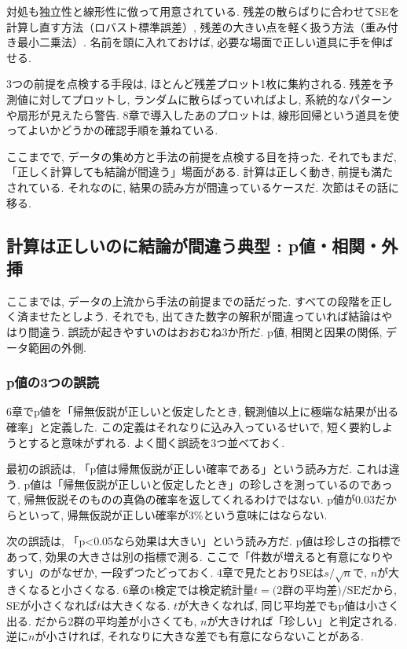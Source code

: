 対処も独立性と線形性に倣って用意されている.
残差の散らばりに合わせてSEを計算し直す方法（ロバスト標準誤差）, 残差の大きい点を軽く扱う方法（重み付き最小二乗法）.
名前を頭に入れておけば, 必要な場面で正しい道具に手を伸ばせる.

3つの前提を点検する手段は, ほとんど残差プロット1枚に集約される.
残差を予測値に対してプロットし, ランダムに散らばっていればよし, 系統的なパターンや扇形が見えたら警告.
8章で導入したあのプロットは, 線形回帰という道具を使ってよいかどうかの確認手順を兼ねている.

ここまでで, データの集め方と手法の前提を点検する目を持った.
それでもまだ, 「正しく計算しても結論が間違う」場面がある.
計算は正しく動き, 前提も満たされている. それなのに, 結果の読み方が間違っているケースだ.
次節はその話に移る.


\subsection{計算は正しいのに結論が間違う典型 : p値・相関・外挿}

ここまでは, データの上流から手法の前提までの話だった.
すべての段階を正しく済ませたとしよう.
それでも, 出てきた数字の解釈が間違っていれば結論はやはり間違う.
誤読が起きやすいのはおおむね3か所だ. p値, 相関と因果の関係, データ範囲の外側.

\subsubsection*{p値の3つの誤読}

6章でp値を「帰無仮説が正しいと仮定したとき, 観測値以上に極端な結果が出る確率」と定義した.
この定義はそれなりに込み入っているせいで, 短く要約しようとすると意味がずれる.
よく聞く誤読を3つ並べておく.

最初の誤読は, 「p値は帰無仮説が正しい確率である」という読み方だ.
これは違う. p値は「帰無仮説が正しいと仮定したとき」の珍しさを測っているのであって, 帰無仮説そのものの真偽の確率を返してくれるわけではない.
p値が0.03だからといって, 帰無仮説が正しい確率が3\%という意味にはならない.

次の誤読は, 「p<0.05なら効果は大きい」という読み方だ.
p値は珍しさの指標であって, 効果の大きさは別の指標で測る.
ここで「件数が増えると有意になりやすい」のがなぜか, 一段ずつたどっておく.
4章で見たとおりSEは$s/\sqrt{n}$で, $n$が大きくなると小さくなる.
6章のt検定では検定統計量$t = \text{(2群の平均差)}/\text{SE}$だから, SEが小さくなれば$t$は大きくなる.
$t$が大きくなれば, 同じ平均差でもp値は小さく出る.
だから2群の平均差が小さくても, $n$が大きければ「珍しい」と判定される.
逆に$n$が小さければ, それなりに大きな差でも有意にならないことがある.

